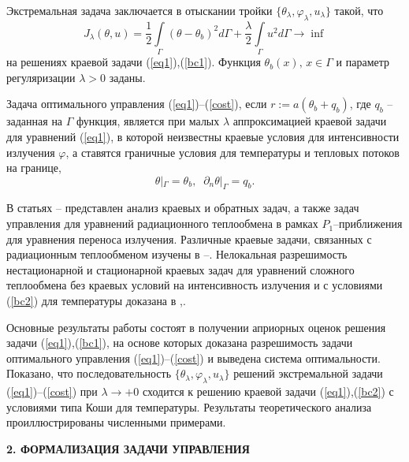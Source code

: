 \documentclass[12pt]{article}
\begin{document}
    Экстремальная задача заключается в отыскании тройки $\{\theta_\lambda,\varphi_\lambda,u_\lambda\}$
    такой, что
    \begin{equation}
        \label{cost}
        J_\lambda(\theta, u) = \frac{1}{2}\int\limits_\Gamma (\theta - \theta_b)^2d\Gamma + \frac{\lambda}{2}\int\limits_\Gamma u^2d\Gamma \rightarrow\inf
    \end{equation}
    на решениях краевой задачи (\ref{eq1}),(\ref{bc1}).
    Функция $\theta_b(x),\, x\in\Gamma$  и параметр регуляризации $\lambda>0$ заданы.

    Задача оптимального управления (\ref{eq1})--(\ref{cost}), если
    $r:=a(\theta_b+q_b)$, где $q_b$ -- заданная на $\Gamma$ функция,
    является при малых $\lambda$ аппроксимацией краевой задачи для уравнений (\ref{eq1}), в которой
    неизвестны краевые условия для интенсивности излучения $\varphi$, а ставятся
    граничные условия для температуры и тепловых потоков на границе,
    \begin{equation}
        \label{bc2}
        \theta|_\Gamma = \theta_b,\;\;
        \partial_n\theta|_\Gamma = q_b.
    \end{equation}


    В статьях \cite{Pinnau07}--\cite{JMAA-19} представлен анализ
    краевых и обратных задач, а также задач управления
    для уравнений радиационного теплообмена
    в рамках $P_1$--приближения для уравнения
    переноса излучения. Различные краевые задачи, связанных с радиационным теплообменом
    изучены в \cite{AmosA05}--\cite{Amosov18}.
    Нелокальная разрешимость
    нестационарной и стационарной краевых задач для уравнений сложного теплообмена
    без краевых условий на интенсивность излучения и
    с условиями (\ref{bc2}) для температуры доказана в
    \cite{CNSNS19},\cite{CMMP20}.


    Основные результаты работы состоят в получении априорных оценок
    решения задачи (\ref{eq1}),(\ref{bc1}), на основе которых
    доказана разрешимость задачи оптимального управления
    (\ref{eq1})--(\ref{cost}) и выведена система оптимальности.
    Показано, что
    последовательность $\{\theta_\lambda,\varphi_\lambda,u_\lambda\}$ решений
    экстремальной задачи (\ref{eq1})--(\ref{cost}) при $\lambda\to +0$
    сходится к решению краевой задачи (\ref{eq1}),(\ref{bc2}) с условиями типа Коши для температуры.
    Результаты теоретического анализа проиллюстрированы численными примерами.


    \begin{center}
        \textbf{2. ФОРМАЛИЗАЦИЯ ЗАДАЧИ УПРАВЛЕНИЯ}
    \end{center}
\end{document}
